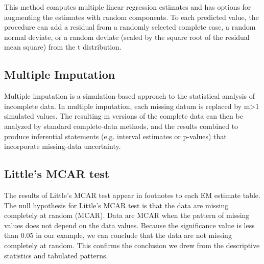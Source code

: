 \documentclass[a4paper,12pt]{article}
\begin{document}
This method computes multiple linear regression estimates and has options for augmenting the estimates with random components. To each predicted value, the procedure can add a residual from a randomly selected complete case, a random normal deviate, or a random deviate (scaled by the square root of the residual mean square) from the t distribution.
\subsection{Multiple Imputation}

Multiple imputation is a simulation-based approach to the statistical analysis of incomplete data. In multiple imputation, each missing datum is replaced by m>1 simulated values. The resulting m versions of the complete data can then be analyzed by standard complete-data methods, and the results combined to produce inferential statements (e.g. interval estimates or p-values) that incorporate missing-data uncertainty.

\subsection{Little's MCAR test}
The results of Little’s MCAR test appear in footnotes to each EM estimate table. The null
hypothesis for Little’s MCAR test is that the data are missing completely at random (MCAR).
Data are MCAR when the pattern of missing values does not depend on the data values. Because
the significance value is less than 0.05 in our example, we can conclude that the data are not
missing completely at random. This confirms the conclusion we drew from the descriptive
statistics and tabulated patterns.
\end{document}
